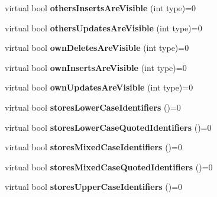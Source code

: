 \begin{DoxyCompactItemize}
\hypertarget{classsql_1_1_database_meta_data_a66e81bddf81337cec0f369bad21f1f3a}{}\label{classsql_1_1_database_meta_data_a66e81bddf81337cec0f369bad21f1f3a} 
virtual bool {\bfseries others\+Inserts\+Are\+Visible} (int type)=0
\item 
\hypertarget{classsql_1_1_database_meta_data_ae90d5439f0ad75666318a9a996c9491d}{}\label{classsql_1_1_database_meta_data_ae90d5439f0ad75666318a9a996c9491d} 
virtual bool {\bfseries others\+Updates\+Are\+Visible} (int type)=0
\item 
\hypertarget{classsql_1_1_database_meta_data_a269fab010a5d2b309e7bbdc13f0702c8}{}\label{classsql_1_1_database_meta_data_a269fab010a5d2b309e7bbdc13f0702c8} 
virtual bool {\bfseries own\+Deletes\+Are\+Visible} (int type)=0
\item 
\hypertarget{classsql_1_1_database_meta_data_ae703402e31eeca2a7befaec316447c0c}{}\label{classsql_1_1_database_meta_data_ae703402e31eeca2a7befaec316447c0c} 
virtual bool {\bfseries own\+Inserts\+Are\+Visible} (int type)=0
\item 
\hypertarget{classsql_1_1_database_meta_data_a6f7a7ef19729070d56949266a8071acb}{}\label{classsql_1_1_database_meta_data_a6f7a7ef19729070d56949266a8071acb} 
virtual bool {\bfseries own\+Updates\+Are\+Visible} (int type)=0
\item 
\hypertarget{classsql_1_1_database_meta_data_a124ce82691fef8f4818686d96dca1d11}{}\label{classsql_1_1_database_meta_data_a124ce82691fef8f4818686d96dca1d11} 
virtual bool {\bfseries stores\+Lower\+Case\+Identifiers} ()=0
\item 
\hypertarget{classsql_1_1_database_meta_data_ae3b3c87912943b27c2944645e69dfb1a}{}\label{classsql_1_1_database_meta_data_ae3b3c87912943b27c2944645e69dfb1a} 
virtual bool {\bfseries stores\+Lower\+Case\+Quoted\+Identifiers} ()=0
\item 
\hypertarget{classsql_1_1_database_meta_data_ac3201371230616a24eae3bc48e908c6a}{}\label{classsql_1_1_database_meta_data_ac3201371230616a24eae3bc48e908c6a} 
virtual bool {\bfseries stores\+Mixed\+Case\+Identifiers} ()=0
\item 
\hypertarget{classsql_1_1_database_meta_data_a8681a718baac0dd170e708d785148ffa}{}\label{classsql_1_1_database_meta_data_a8681a718baac0dd170e708d785148ffa} 
virtual bool {\bfseries stores\+Mixed\+Case\+Quoted\+Identifiers} ()=0
\item 
\hypertarget{classsql_1_1_database_meta_data_aca12603a6c30703aebc4f85367f5d00b}{}\label{classsql_1_1_database_meta_data_aca12603a6c30703aebc4f85367f5d00b} 
virtual bool {\bfseries stores\+Upper\+Case\+Identifiers} ()=0

\end{DoxyCompactItemize}
